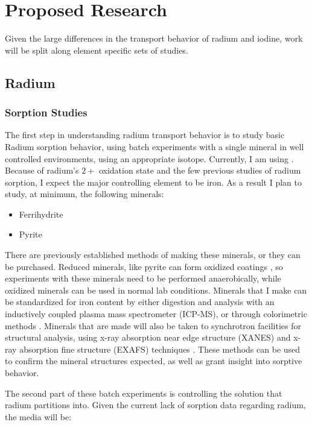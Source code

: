 \documentclass[twoside,12pt,titlepage]{article}
\newcommand{\isotope}[2]{\ch{^{#1}#2}}
\begin{document}
\section{Proposed Research}

Given the large differences in the transport behavior of radium and iodine, work will be split along element specific sets of studies.

\subsection{Radium}

\subsubsection{Sorption Studies}
The first step in understanding radium transport behavior is to study basic Radium sorption behavior, using batch experiments with a single mineral in well controlled environments, using an appropriate isotope. Currently, I am using \isotope{226}{Ra}. Because of radium's $2+$ oxidation state and the few previous studies of radium sorption, I expect the major controlling element to be iron. As a result I plan to study, at minimum, the following minerals:

\begin{itemize}
	\item Ferrihydrite
	\item Pyrite
\end{itemize}

There are previously established methods of making these minerals, or they can be purchased. Reduced minerals, like pyrite can form oxidized coatings \cite{Buckley1987}, so experiments with these minerals need to be performed anaerobically, while oxidized minerals can be used in normal lab conditions. Minerals that I make can be standardized for iron content by either digestion and analysis with an inductively coupled plasma mass spectrometer (ICP-MS), or through colorimetric methods \cite{Viollier2000}. Minerals that are made will also be taken to synchrotron facilities for structural analysis, using x-ray absorption near edge structure (XANES) and x-ray absorption fine structure (EXAFS) techniques \cite{Fendorf1999}. These methods can be used to confirm the mineral structures expected, as well as grant insight into sorptive behavior.
\par The second part of these batch experiments is controlling the solution that radium partitions into. Given the current lack of sorption data regarding radium, the media will be:
\end{document}
